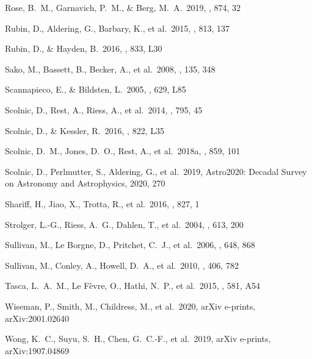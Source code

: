 \documentclass[]{aa} %
\begin{document}
\begin{thebibliography}{}
 Rose, B.~M., Garnavich, P.~M., \& Berg, M.~A.\ 2019, \apj, 874, 32


 Rubin, D., Aldering, G., Barbary, K., et al.\ 2015, \apj, 813, 137

 Rubin, D., \& Hayden, B.\ 2016, \apjl, 833, L30


 Sako, M., Bassett, B., Becker, A., et al.\ 2008, \aj, 135, 348

 Scannapieco, E., \& Bildsten, L.\ 2005, \apjl, 629, L85 

 Scolnic, D., Rest, A., Riess, A., et al.\ 2014, \apj, 795, 45

 Scolnic, D., \& Kessler, R.\ 2016, \apjl, 822, L35


 Scolnic, D.~M., Jones, D.~O., Rest, A., et al.\ 2018a, \apj, 859, 101


 Scolnic, D., Perlmutter, S., Aldering, G., et al.\ 2019, Astro2020: Decadal Survey on Astronomy and Astrophysics, 2020, 270

 Shariff, H., Jiao, X., Trotta, R., et al.\ 2016, \apj, 827, 1


 Strolger, L.-G., Riess, A.~G., Dahlen, T., et al.\ 2004, \apj, 613, 200

 Sullivan, M., Le  Borgne, D., Pritchet, C.~J., et al.\ 2006, \apj, 648, 868 


 Sullivan, M., Conley, A., Howell, D.~A., et al.\ 2010, \mnras, 406, 782

 Tasca, L.~A.~M., Le F{\`e}vre, O., Hathi, N.~P., et al.\ 2015, \aap, 581, A54

 Wiseman, P., Smith, M., Childress, M., et al.\ 2020, arXiv e-prints, arXiv:2001.02640


 Wong, K.~C., Suyu, S.~H., Chen, G.~C.-F., et al.\ 2019, arXiv e-prints, arXiv:1907.04869


\end{thebibliography}
\end{document}
